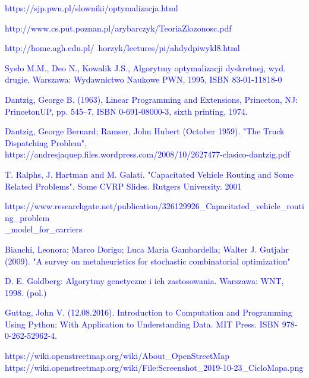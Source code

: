 \documentclass[a4paper, twoside, 12pt, justified]{article}
\begin{document}
	\newpage
	\renewcommand\refname{Źródła}
	\begin{thebibliography}{}
		{\hypertarget{optymalizacja}{\textcolor{blue}{
		https://sjp.pwn.pl/slowniki/optymalizacja.html}}}
	
		{\hypertarget{problemy}{\textcolor{blue}{
		http://www.cs.put.poznan.pl/arybarczyk/TeoriaZlozonosc.pdf}}}
	
		{\hypertarget{zlozonosc}{\textcolor{blue}{
		http://home.agh.edu.pl/~horzyk/lectures/pi/ahdydpiwykl8.html}}}

		{\hypertarget{komiwojazer}{\textcolor{blue}{
		Sysło M.M., Deo N., Kowalik J.S., Algorytmy optymalizacji dyskretnej, wyd. drugie, Warszawa: Wydawnictwo Naukowe PWN, 1995, ISBN 83-01-11818-0}}}
	
		{\hypertarget{dfj}{\textcolor{blue}{
		Dantzig, George B. (1963), Linear Programming and Extensions, Princeton, NJ: PrincetonUP, pp. 545–7, ISBN 0-691-08000-3, sixth printing, 1974.}}}
	
		{\hypertarget{vrp}{\textcolor{blue}{
		 Dantzig, George Bernard; Ramser, John Hubert (October 1959). "The Truck Dispatching Problem", https://andresjaquep.files.wordpress.com/2008/10/2627477-clasico-dantzig.pdf}}}
		
		{\hypertarget{cvrp}{\textcolor{blue}{T. Ralphs, J. Hartman and M. Galati. "Capacitated Vehicle Routing and Some Related Problems". Some CVRP Slides. Rutgers University. 2001}}}
		
		{\hypertarget{cvrp2}{\textcolor{blue}{https://www.researchgate.net/publication/326129926\_Capacitated\_vehicle\_routing\_problem\\\_model\_for\_carriers}}}
		
		{\hypertarget{metaheurystyka}{\textcolor{blue}{Bianchi, Leonora; Marco Dorigo; Luca Maria Gambardella; Walter J. Gutjahr (2009). "A survey on metaheuristics for stochastic combinatorial optimization"}}}
		
		{\hypertarget{ag}{\textcolor{blue}{
		D. E. Goldberg: Algorytmy genetyczne i ich zastosowania. Warszawa: WNT, 1998. (pol.)}}}
	
		{\hypertarget{python}{\textcolor{blue}{
		 Guttag, John V. (12.08.2016). Introduction to Computation and Programming Using Python: With Application to Understanding Data. MIT Press. ISBN 978-0-262-52962-4.}}}
	 
	 	{\hypertarget{osm}{\textcolor{blue}{
		https://wiki.openstreetmap.org/wiki/About\_OpenStreetMap}}}
		{\hypertarget{osm_example}{\textcolor{blue}{
		https://wiki.openstreetmap.org/wiki/File:Screenshot\_2019-10-23\_CicloMapa.png
		}}}

	\end{thebibliography}
	
	
	
\end{document}
